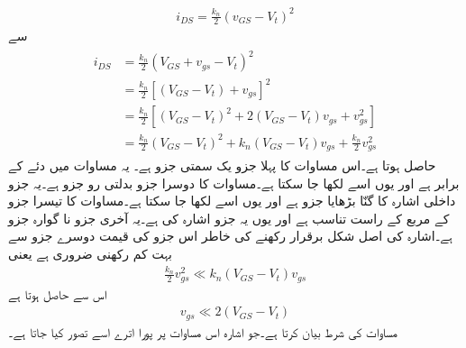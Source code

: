 \begin{align}\label{شناخت_مساوات_ماسفیٹ_خط_کی_مساوات_بدلتی_رو}
i_{DS}=\frac{k_n}{2} \left(v_{GS}-V_t \right)^2
\end{align}
سے
\begin{gather} \label{مساوات_میدانی_رو_کے_حصے}
\begin{aligned}
i_{DS}&=\frac{k_n}{2} \left(V_{GS}+v_{gs}-V_t \right )^2\\
&=\frac{k_n}{2}\left[\left(V_{GS}-V_t\right)+v_{gs} \right ]^2\\
&=\frac{k_n}{2} \left[\left(V_{GS}-V_t \right )^2+2 \left(V_{GS}-V_t \right ) v_{gs}+v_{gs}^{2} \right ] \\
&=\frac{k_n}{2} \left(V_{GS}-V_t \right )^2+k_n \left(V_{GS}-V_t \right ) v_{gs}+ \frac{k_n}{2} v_{gs}^{2} 
\end{aligned}
\end{gather}
حاصل ہوتا ہے۔اس مساوات کا پہلا جزو    یک سمتی جزو ہے۔ یہ مساوات   میں دئے   کے برابر ہے اور یوں اسے  لکھا جا سکتا ہے۔مساوات کا دوسرا جزو   بدلتی رو جزو ہے۔یہ جزو داخلی اشارہ کا   گنّا بڑھایا جزو ہے اور یوں اسے   لکھا جا سکتا ہے۔مساوات کا تیسرا جزو  کے مربع کے راست تناسب ہے اور یوں یہ جزو اشارہ کی   ہے۔یہ آخری جزو   نا گوارہ جزو ہے۔اشارہ کی اصل شکل برقرار رکھنے کی خاطر اس جزو کی قیمت دوسرے جزو سے بہت کم رکھنی ضروری ہے یعنی
\begin{align*}
\frac{k_n}{2}v_{gs}^2 \ll k_n \left(V_{GS}-V_t \right )v_{gs}
\end{align*}
اس سے حاصل ہوتا ہے
\begin{align} \label{مساوات_میدانی_باریک_اشارہ_کی_شرط}
v_{gs} \ll 2 \left(V_{GS}-V_t \right )
\end{align}
مساوات      کی شرط بیان کرتا ہے۔جو اشارہ اس مساوات پر پورا اترے اسے  تصور کیا جاتا ہے۔

